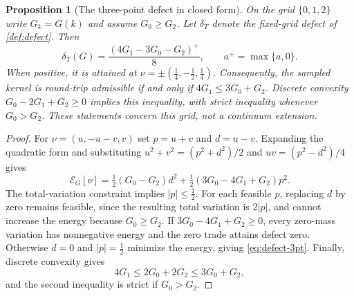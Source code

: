 \documentclass[11pt]{article}
\numberwithin{equation}{section}
\newtheorem{proposition}[theorem]{Proposition}
\theoremstyle{definition}
\theoremstyle{remark}
\theoremstyle{definition}
\begin{document}
\begin{proposition}[The three-point defect in closed form]\label{prop:defect-3pt}
On the grid $\{0,1,2\}$ write $G_k=G(k)$ and assume $G_0\geq G_2$.
Let $\delta_T$ denote the fixed-grid defect of \cref{def:defect}. Then
\begin{equation}\label{eq:defect-3pt}
 \delta_T(G)=\frac{(4G_1-3G_0-G_2)^+}{8},\qquad a^+=\max\{a,0\}.
\end{equation}
When positive, it is attained at
$\nu=\pm(\tfrac14,-\tfrac12,\tfrac14)$.
Consequently, the sampled kernel is round-trip admissible if and only if
$4G_1\leq3G_0+G_2$. Discrete convexity
$G_0-2G_1+G_2\geq0$ implies this inequality, with strict inequality whenever
$G_0>G_2$. These statements concern this grid, not a continuum extension.
\end{proposition}
\begin{proof}
For $\nu=(u,-u-v,v)$ set $p=u+v$ and $d=u-v$. Expanding the quadratic
form and substituting $u^2+v^2=(p^2+d^2)/2$ and $uv=(p^2-d^2)/4$ gives
\begin{equation}\label{eq:defect-3pt-energy}
 \mathcal E_G[\nu]=\tfrac12(G_0-G_2)d^2
                  +\tfrac12(3G_0-4G_1+G_2)p^2.
\end{equation}
The total-variation constraint implies $|p|\leq\tfrac12$. For each feasible
$p$, replacing $d$ by zero remains feasible, since the resulting total
variation is $2|p|$, and cannot increase the energy because $G_0\geq G_2$.
If $3G_0-4G_1+G_2\geq0$, every zero-mass variation has nonnegative energy
and the zero trade attains defect zero. Otherwise $d=0$ and
$|p|=\tfrac12$ minimize the energy, giving \eqref{eq:defect-3pt}.
Finally, discrete convexity gives
\[
 4G_1\leq2G_0+2G_2\leq3G_0+G_2,
\]
and the second inequality is strict if $G_0>G_2$.
\end{proof}
\end{document}
